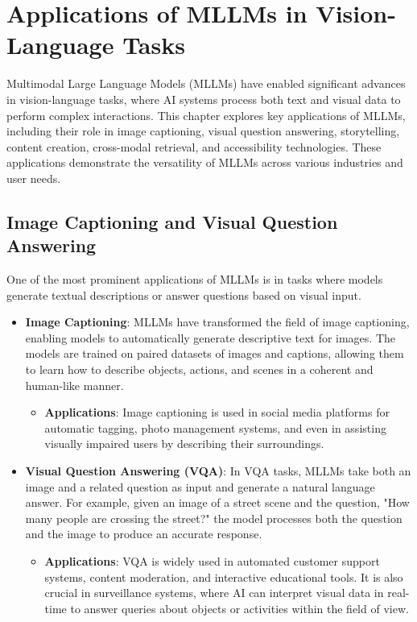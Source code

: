\chapter{Applications of MLLMs in Vision-Language Tasks}

Multimodal Large Language Models (MLLMs) have enabled significant advances in vision-language tasks, where AI systems process both text and visual data to perform complex interactions. This chapter explores key applications of MLLMs, including their role in image captioning, visual question answering, storytelling, content creation, cross-modal retrieval, and accessibility technologies. These applications demonstrate the versatility of MLLMs across various industries and user needs.

\section{Image Captioning and Visual Question Answering}

One of the most prominent applications of MLLMs is in tasks where models generate textual descriptions or answer questions based on visual input.

\begin{itemize}
    \item \textbf{Image Captioning}: MLLMs have transformed the field of image captioning, enabling models to automatically generate descriptive text for images. The models are trained on paired datasets of images and captions, allowing them to learn how to describe objects, actions, and scenes in a coherent and human-like manner.
    \begin{itemize}
        \item \textbf{Applications}: Image captioning is used in social media platforms for automatic tagging, photo management systems, and even in assisting visually impaired users by describing their surroundings.
    \end{itemize}
    \item \textbf{Visual Question Answering (VQA)}: In VQA tasks, MLLMs take both an image and a related question as input and generate a natural language answer. For example, given an image of a street scene and the question, "How many people are crossing the street?" the model processes both the question and the image to produce an accurate response.
    \begin{itemize}
        \item \textbf{Applications}: VQA is widely used in automated customer support systems, content moderation, and interactive educational tools. It is also crucial in surveillance systems, where AI can interpret visual data in real-time to answer queries about objects or activities within the field of view.
    \end{itemize}
\end{itemize}

